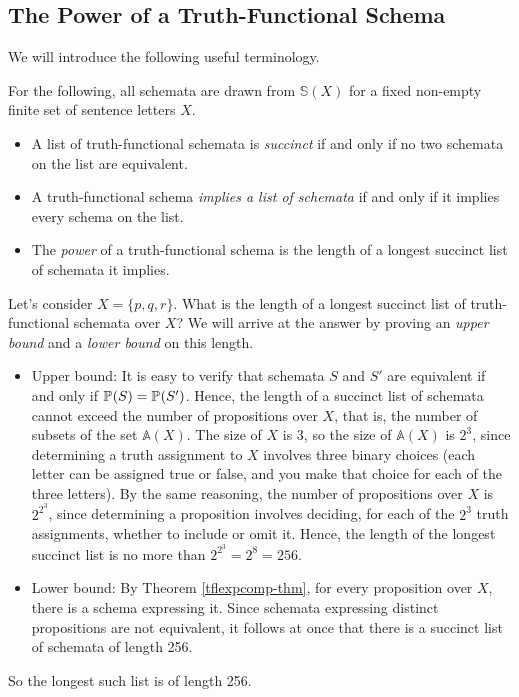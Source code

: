 \subsection{The Power of a Truth-Functional Schema}
We will introduce the following useful terminology.
\begin{definition} 
For the following, all schemata are drawn from $\mathbb{S}(X)$ for a fixed non-empty finite set of sentence letters $X$.
\begin{itemize}
\item 
A list of truth-functional schemata is \textit{succinct} if and only if no two schemata on the list are equivalent. 
\item 
A truth-functional schema \textit{implies a list of schemata} if and only if it implies every schema on the list.
\item The \textit{power} of a truth-functional schema is the length of a longest succinct list of schemata it implies.  
\end{itemize}
\end{definition}

\begin{example}
    Let's consider $X=\{p,q,r\}$. What is the length of a longest succinct list of truth-functional schemata over $X$? We will arrive at the answer by proving an \emph{upper bound} and a \emph{lower bound} on this length.

    \begin{itemize}
        \item Upper bound: It is easy to verify that schemata $S$ and $S'$ are equivalent if and only if $\mbox{$\mathbb{P}_{}(S)$}=\mbox{$\mathbb{P}_{}(S')$}$. Hence, the length of a succinct list of schemata cannot exceed the number of propositions over $X$, that is, the number of subsets of the set $\mathbb{A}(X)$. The size of $X$ is 3, so the size of $\mathbb{A}(X)$ is $2^3$, since determining a truth assignment to $X$ involves three binary choices (each letter can be assigned true or false, and you make that choice for each of the three letters). By the same reasoning, the number of propositions over $X$ is $2^{2^3}$, since determining a proposition involves deciding, for each of the $2^3$ truth assignments, whether to include or omit it. Hence, the length of the longest succinct list is no more than $2^{2^3} = 2^8 = 256$.

        \item Lower bound: By Theorem \ref{tflexpcomp-thm}, for every proposition over $X$, there is a schema expressing it. Since schemata expressing distinct propositions are not equivalent, it follows at once that there is a succinct list of schemata of length 256.
    \end{itemize}
    So the longest such list is of length 256.
\end{example}

